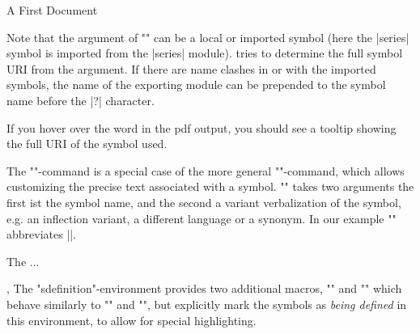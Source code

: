 \begin{sfragment}{A First \sTeX Document}
\begin{function}{\symname}
      Note that the argument of \stexcode"\symref" can be a local or imported symbol
      (here the |series| symbol is imported from the |series| module). \sTeX tries to
      determine the full symbol URI from the argument. If there are name clashes in or
      with the imported symbols, the name of the exporting module can be prepended to the
      symbol name before the |?| character.

      If you hover over the word
      in the pdf output, you should see a tooltip showing the full URI
      of the symbol used.
    \end{function}
    \begin{function}{\symref}
      The \stexcode"\symname"-command is a special case of the more general
      \stexcode"\symref"-command, which allows customizing the precise text associated
      with a symbol. \stexcode"\symref" takes two arguments the first ist the symbol
      name, and the second a variant verbalization of the symbol, e.g. an inflection
      variant, a different language or a synonym. In our example
      \stexcode"" abbreviates \stexcode||.
      
    \end{function}
    \begin{latexcode}[numbers=none,aboveskip=0pt,belowskip=0pt,gobble=6]
      The  ...
    \end{latexcode}
    \begin{function}{,}
      The \stexcode"sdefinition"-environment provides two additional
      macros, \stexcode"" and \stexcode"" which behave
      similarly to \stexcode"\symname" and \stexcode"\symref", but explicitly mark
      the symbols as \emph{being defined} in this environment,
      to allow for special highlighting.
    \end{function}\bigskip


\end{sfragment}
